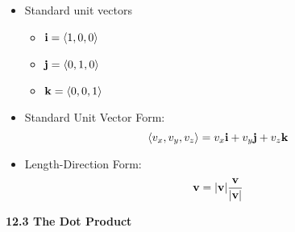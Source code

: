 \begin{itemize}
\begin{itemize}
\begin{itemize}
    \item Standard unit vectors
      \begin{itemize}
      \item $\mathbf{i} = \left<1,0,0\right>$
      \item $\mathbf{j} = \left<0,1,0\right>$
      \item $\mathbf{k} = \left<0,0,1\right>$
      \end{itemize}

    \item Standard Unit Vector Form:
      \[\left<v_x,v_y,v_z\right> = v_x\mathbf{i} + v_y\mathbf{j} + v_z\mathbf{k}\]

    \item Length-Direction Form:
      \[\mathbf{v} = |\mathbf{v}|\frac{\mathbf{v}}{|\mathbf{v}|}\]

    \end{itemize}
  \end{itemize}
\end{itemize}

\newpage
  
\centerline{\bf 12.3 The Dot Product}
  
